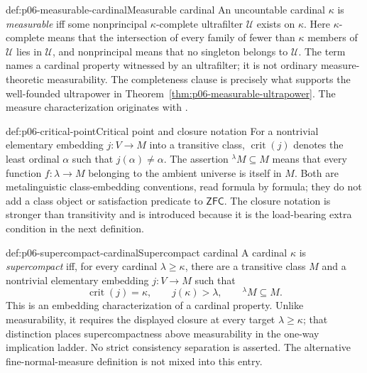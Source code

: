 \begin{hbdefinition}{def:p06-measurable-cardinal}{Measurable cardinal}
An uncountable cardinal \(\kappa\) is \emph{measurable} iff some nonprincipal
\(\kappa\)-complete ultrafilter \(\mathcal U\) exists on \(\kappa\).  Here
\(\kappa\)-complete means that the intersection of every family of fewer than
\(\kappa\) members of \(\mathcal U\) lies in \(\mathcal U\), and nonprincipal
means that no singleton belongs to \(\mathcal U\).  The term names a cardinal
property witnessed by
an ultrafilter; it is not ordinary measure-theoretic measurability.  The
completeness clause is precisely what supports the well-founded ultrapower in
Theorem~\ref{thm:p06-measurable-ultrapower}.
The measure characterization originates with \cite{Ulam1930}.
\end{hbdefinition}

\begin{hbconvention}{def:p06-critical-point}{Critical point and closure notation}
For a nontrivial elementary embedding \(j:V\to M\) into a transitive class,
\(\operatorname{crit}(j)\) denotes the least ordinal \(\alpha\) such that
\(j(\alpha)\ne\alpha\).  The assertion \({}^{\lambda}M\subseteq M\) means
that every function \(f:\lambda\to M\) belonging to the ambient universe is
itself in \(M\).  Both are metalinguistic class-embedding conventions, read
formula by formula; they do not add a class object or satisfaction predicate
to \(\mathsf{ZFC}\).  The closure notation is stronger than transitivity and
is introduced because it is the load-bearing extra condition in the next
definition.
\end{hbconvention}

\begin{hbdefinition}{def:p06-supercompact-cardinal}{Supercompact cardinal}
A cardinal \(\kappa\) is \emph{supercompact} iff, for every cardinal
\(\lambda\geq\kappa\), there are a transitive class \(M\) and a nontrivial
elementary embedding \(j:V\to M\) such that
\[
  \operatorname{crit}(j)=\kappa,
  \qquad j(\kappa)>\lambda,
  \qquad {}^{\lambda}M\subseteq M.
\]
This is an embedding characterization of a cardinal property.  Unlike
measurability, it requires the displayed closure at every target
\(\lambda\geq\kappa\); that distinction places supercompactness above
measurability in the one-way implication ladder.  No strict consistency
separation is asserted.  The alternative fine-normal-measure definition is
not mixed into this entry.
\end{hbdefinition}

